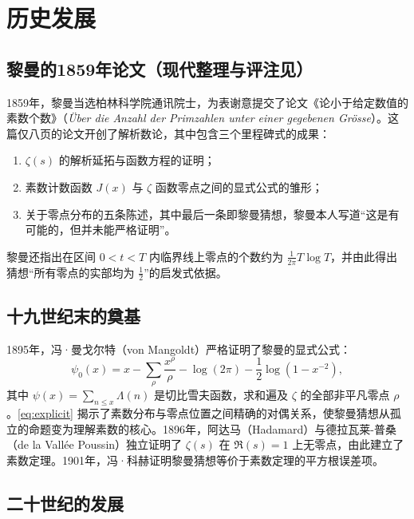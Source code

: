 \section{历史发展}\label{sec:history}

\subsection{黎曼的1859年论文（现代整理与评注见\cite{edwards1974riemann}）}

1859年，黎曼当选柏林科学院通讯院士，为表谢意提交了论文《论小于给定数值的素数个数》（\textit{Über die Anzahl der Primzahlen unter einer gegebenen Grösse}）\cite{riemann1859prime}。这篇仅八页的论文开创了解析数论，其中包含三个里程碑式的成果：

\begin{enumerate}[label=(\arabic*)]
    \item $\zeta(s)$ 的解析延拓与函数方程的证明；
    \item 素数计数函数 $J(x)$ 与 $\zeta$ 函数零点之间的显式公式的雏形；
    \item 关于零点分布的五条陈述，其中最后一条即黎曼猜想，黎曼本人写道“这是有可能的，但并未能严格证明”。
\end{enumerate}

黎曼还指出在区间 $0 < t < T$ 内临界线上零点的个数约为 $\tfrac{1}{2\pi} T \log T$，并由此得出猜想“所有零点的实部均为 $\tfrac{1}{2}$”的启发式依据。

\subsection{十九世纪末的奠基}

1895年，冯·曼戈尔特（von Mangoldt）严格证明了黎曼的显式公式\cite{vonmangoldt1895}：
\begin{equation}\label{eq:explicit}
    \psi_0(x) = x - \sum_{\rho} \frac{x^{\rho}}{\rho} - \log(2\pi) - \frac{1}{2}\log\!\left(1 - x^{-2}\right),
\end{equation}
其中 $\psi(x) = \sum_{n \le x} \Lambda(n)$ 是切比雪夫函数，求和遍及 $\zeta$ 的全部非平凡零点 $\rho$。\cref{eq:explicit} 揭示了素数分布与零点位置之间精确的对偶关系，使黎曼猜想从孤立的命题变为理解素数的核心。1896年，阿达马（Hadamard）与德拉瓦莱-普桑（de la Vallée Poussin）独立证明了 $\zeta(s)$ 在 $\Re(s)=1$ 上无零点，由此建立了素数定理。1901年，冯·科赫证明黎曼猜想等价于素数定理的平方根误差项\cite{vonkoch1901}。

\subsection{二十世纪的发展}

